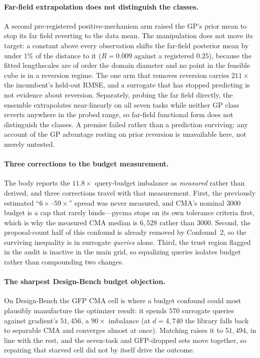 \documentclass[letterpaper]{article}
\theoremstyle{plain}
\begin{document}
\paragraph{Far-field extrapolation does not distinguish the classes.} A second pre-registered positive-mechanism arm raised the GP's prior mean to stop its far field reverting to the data mean. The manipulation does not move its target: a constant above every observation shifts the far-field posterior mean by under $1\%$ of the distance to it ($R{=}0.009$ against a registered $0.25$), because the fitted lengthscales are of order the domain diameter and no point in the feasible cube is in a reversion regime. The one arm that removes reversion carries $211\times$ the incumbent's held-out RMSE, and a surrogate that has stopped predicting is not evidence about reversion. Separately, probing the far field directly, the ensemble extrapolates near-linearly on all seven tasks while neither GP class reverts anywhere in the probed range, so far-field functional form does not distinguish the classes. A premise failed rather than a prediction surviving: any account of the GP advantage resting on prior reversion is unavailable here, not merely untested.

\paragraph{Three corrections to the budget measurement.} The body reports the $11.8\times$ query-budget imbalance as \emph{measured} rather than derived, and three corrections travel with that measurement. First, the previously estimated ``$6\times$--$59\times$'' spread was never measured, and CMA's nominal $3000$ budget is a cap that rarely binds---pycma stops on its own tolerance criteria first, which is why the measured CMA median is $6{,}528$ rather than $3000$. Second, the proposal-count half of this confound is already removed by Confound~2, so the surviving inequality is in surrogate \emph{queries} alone. Third, the trust region flagged in the audit is inactive in the main grid, so equalizing queries isolates budget rather than compounding two changes.

\paragraph{The sharpest Design-Bench budget objection.} On Design-Bench the GFP CMA cell is where a budget confound could most plausibly manufacture the optimizer result: it spends $570$ surrogate queries against gradient's $51{,}456$, a $90\times$ imbalance (at $d{=}4{,}740$ the library falls back to separable CMA and converges almost at once). Matching raises it to $51{,}494$, in line with the rest, and the seven-task and GFP-dropped sets move together, so repairing that starved cell did not by itself drive the outcome.
\end{document}

